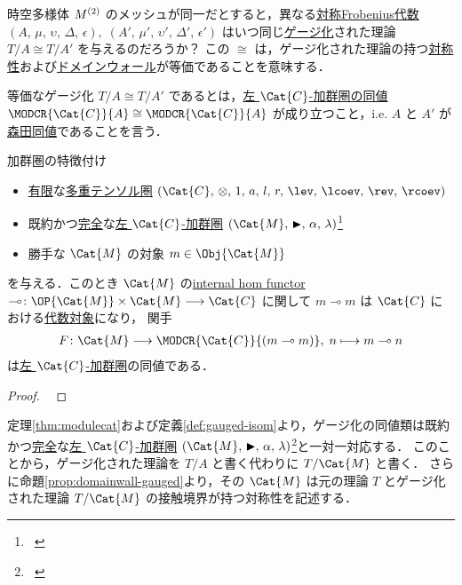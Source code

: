 \documentclass[TQFT_main]{subfiles}
\begin{document}
時空多様体 $M^{(2)}$ のメッシュが同一だとすると，異なる\hyperref[def:sym-Frobenius]{対称Frobenius代数} $(A,\, \mu,\, \upsilon,\, \Delta,\, \epsilon),\; (A',\, \mu',\, \upsilon',\, \Delta',\, \epsilon')$ はいつ同じ\hyperref[def:gauging]{ゲージ化}された理論 $T/A \cong T/A'$ を与えるのだろうか？
この $\cong$ は，ゲージ化された理論の持つ\hyperref[ax:symcat-2d-0form]{対称性}および\hyperref[prop:domainwall-gauged]{ドメインウォール}が等価であることを意味する．

\begin{mydef}[label=def:gauged-isom]{等価なゲージ化}
    $T/A \cong T/A'$ であるとは，\hyperref[def:tensor-functor]{左 $\Cat{C}$-加群圏の同値} $\MODCR{\Cat{C}}{A} \cong \MODCR{\Cat{C}}{A}$ が成り立つこと，i.e. $A$ と $A'$ が\hyperref[def:Morita-equiv]{森田同値}であることを言う．
\end{mydef}

\begin{mytheo}[label=thm:modulecat]{加群圏の特徴付け}
    \begin{itemize}
        \item \hyperref[def:finite-abcat]{有限}な\hyperref[def:tenosrfusion-cat]{多重テンソル圏} $(\Cat{C},\, \otimes,\, 1,\, a,\, l,\, r,\, \lev,\, \lcoev,\, \rev,\, \rcoev)$
        \item 既約かつ\hyperref[def:modulecat-exact]{完全}な\hyperref[def:modulecat]{左 $\Cat{C}$-加群圏} $(\Cat{M},\, \btr,\, \alpha,\, \lambda)$\footnote{~\cite[p.152]{etingof2015tensor}}
        \item 勝手な $\Cat{M}$ の対象 $m \in \Obj{\Cat{M}}$
    \end{itemize}
    を与える．このとき $\Cat{M}$ の\hyperref[def:internal-hom]{internal hom functor} $\multimap \colon \OP{\Cat{M}} \times \Cat{M} \lto \Cat{C}$ に関して $m \multimap m$ は $\Cat{C}$ における\hyperref[def:algobj]{代数対象}になり，
    関手
    \begin{align}
        F \colon \Cat{M} \lto \MODCR{\Cat{C}}{(m \multimap m)},\; n \lmto m \multimap n
    \end{align}
    は\hyperref[def:modulecat]{左 $\Cat{C}$-加群圏}の同値である．

\end{mytheo}

\begin{proof}
    ~\cite[THEOREM7.10.1, p.150]{etingof2015tensor}
\end{proof}

定理\ref{thm:modulecat}および定義\ref{def:gauged-isom}より，ゲージ化の同値類は既約かつ\hyperref[def:modulecat-exact]{完全}な\hyperref[def:modulecat]{左 $\Cat{C}$-加群圏} $(\Cat{M},\, \btr,\, \alpha,\, \lambda)$\footnote{~\cite[p.152]{etingof2015tensor}}と一対一対応する．
このことから，ゲージ化された理論を $T/A$ と書く代わりに $T/\Cat{M}$ と書く．
さらに命題\ref{prop:domainwall-gauged}より，その $\Cat{M}$ は元の理論 $T$ とゲージ化された理論 $T/\Cat{M}$ の接触境界が持つ対称性を記述する．
\end{document}
